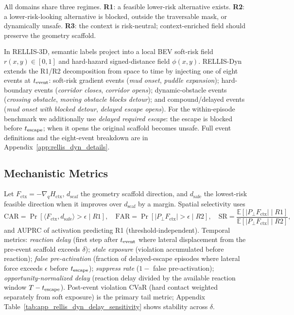 All domains share three regimes.
\textbf{R1}: a feasible lower-risk alternative exists.
\textbf{R2}: a lower-risk-looking alternative is blocked, outside the
traversable mask, or dynamically unsafe.
\textbf{R3}: the context is risk-neutral; context-enriched field should preserve the
geometry scaffold.

In RELLIS-3D, semantic labels project into a local BEV soft-risk field
$r(x,y)\in[0,1]$ and hard-hazard signed-distance field $\phi(x,y)$.
RELLIS-Dyn extends the R1/R2 decomposition from space to time by
injecting one of eight events at $t_{\rm event}$: soft-risk gradient
events (\emph{mud onset}, \emph{puddle expansion}); hard-boundary events
(\emph{corridor closes}, \emph{corridor opens}); dynamic-obstacle events
(\emph{crossing obstacle}, \emph{moving obstacle blocks detour}); and
compound/delayed events (\emph{mud onset with blocked detour},
\emph{delayed escape opens}).
For the within-episode benchmark we additionally use
\emph{delayed required escape}: the escape is blocked before
$t_{\rm escape}$; when it opens the original scaffold becomes unsafe.
Full event definitions and the eight-event breakdown are in
Appendix~\ref{app:rellis_dyn_details}.

\subsection{Mechanistic Metrics}
\label{sec:exp_mechanistic_metrics}

Let $F_{\mathrm{ctx}}=-\nabla_q H_{\mathrm{ctx}}$, $d_{\mathrm{scaf}}$
the geometry scaffold direction, and $d_{\mathrm{safe}}$ the lowest-risk
feasible direction when it improves over $d_{\mathrm{scaf}}$ by a margin.
Spatial selectivity uses
\begin{equation}
\mathrm{CAR}=\Pr[\langle F_{\mathrm{ctx}},d_{\mathrm{safe}}\rangle{>}\epsilon\mid R1],\quad
\mathrm{FAR}=\Pr[|P_\perp F_{\mathrm{ctx}}|{>}\epsilon\mid R2],\quad
\mathrm{SR}=\frac{\mathbb{E}[|P_\perp F_{\mathrm{ctx}}|\mid R1]}
               {\mathbb{E}[|P_\perp F_{\mathrm{ctx}}|\mid R2]},
\end{equation}
and AUPRC of activation predicting R1 (threshold-independent).
Temporal metrics: \emph{reaction delay} (first step after $t_{\rm event}$
where lateral displacement from the pre-event scaffold exceeds $\delta$);
\emph{stale exposure} (violation accumulated before reaction);
\emph{false pre-activation} (fraction of delayed-escape episodes where
lateral force exceeds $\epsilon$ before $t_{\rm escape}$);
\emph{suppress rate} ($1 -$ false pre-activation);
\emph{opportunity-normalized delay} (reaction delay divided by the
available reaction window $T - t_{\rm escape}$).
Post-event violation CVaR (hard contact weighted separately from soft
exposure) is the primary tail metric;
Appendix Table~\ref{tab:app_rellis_dyn_delay_sensitivity} shows
stability across $\delta$.

